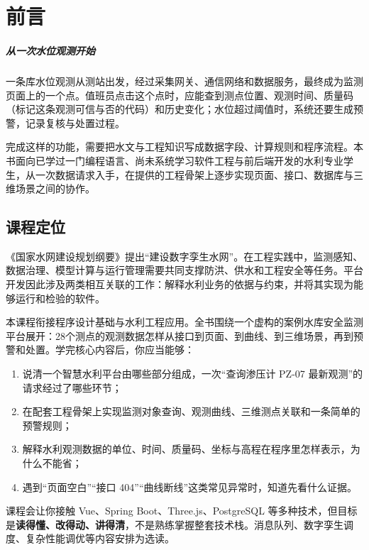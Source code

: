 \chapter*{前言}

\begin{notebox}
\paragraph{从一次水位观测开始}

一条库水位观测从测站出发，经过采集网关、通信网络和数据服务，最终成为监测页面上的一个点。值班员点击这个点时，应能查到测点位置、观测时间、质量码（标记这条观测可信与否的代码）和历史变化；水位超过阈值时，系统还要生成预警，记录复核与处置过程。

完成这样的功能，需要把水文与工程知识写成数据字段、计算规则和程序流程。本书面向已学过一门编程语言、尚未系统学习软件工程与前后端开发的水利专业学生，从一次数据请求入手，在提供的工程骨架上逐步实现页面、接口、数据库与三维场景之间的协作。
\end{notebox}

\section*{课程定位}

《国家水网建设规划纲要》提出“建设数字孪生水网”\cite{nationalWaterNetwork2023}。在工程实践中，监测感知、数据治理、模型计算与运行管理需要共同支撑防洪、供水和工程安全等任务。平台开发因此涉及两类相互关联的工作：解释水利业务的依据与约束，并将其实现为能够运行和检验的软件。

本课程衔接程序设计基础与水利工程应用。全书围绕一个虚构的案例水库安全监测平台展开：28个测点的观测数据怎样从接口到页面、到曲线、到三维场景，再到预警和处置。学完核心内容后，你应当能够：

\begin{enumerate}
\item 说清一个智慧水利平台由哪些部分组成，一次“查询渗压计 PZ-07 最新观测”的请求经过了哪些环节；
\item 在配套工程骨架上实现监测对象查询、观测曲线、三维测点关联和一条简单的预警规则；
\item 解释水利观测数据的单位、时间、质量码、坐标与高程在程序里怎样表示，为什么不能省；
\item 遇到“页面空白”“接口 404”“曲线断线”这类常见异常时，知道先看什么证据。
\end{enumerate}

课程会让你接触 Vue、Spring Boot、Three.js、PostgreSQL 等多种技术，但目标是\textbf{读得懂、改得动、讲得清}，不是熟练掌握整套技术栈。消息队列、数字孪生调度、复杂性能调优等内容安排为选读。

